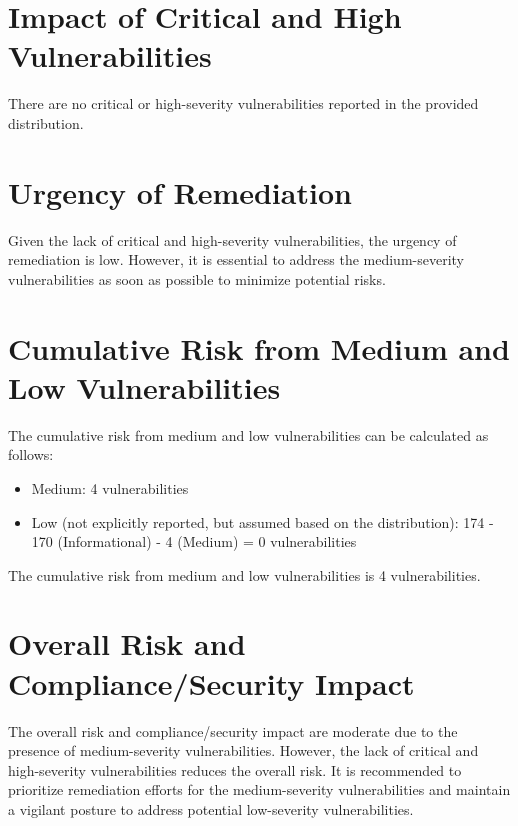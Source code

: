 \section{Impact of Critical and High Vulnerabilities}

There are no critical or high-severity vulnerabilities reported in the provided distribution.

\section{Urgency of Remediation}

Given the lack of critical and high-severity vulnerabilities, the urgency of remediation is low. However, it is essential to address the medium-severity vulnerabilities as soon as possible to minimize potential risks.

\section{Cumulative Risk from Medium and Low Vulnerabilities}

The cumulative risk from medium and low vulnerabilities can be calculated as follows:
\begin{itemize}
\item Medium: 4 vulnerabilities
\item Low (not explicitly reported, but assumed based on the distribution): 174 - 170 (Informational) - 4 (Medium) = 0 vulnerabilities
\end{itemize}
The cumulative risk from medium and low vulnerabilities is 4 vulnerabilities.

\section{Overall Risk and Compliance/Security Impact}

The overall risk and compliance/security impact are moderate due to the presence of medium-severity vulnerabilities. However, the lack of critical and high-severity vulnerabilities reduces the overall risk. It is recommended to prioritize remediation efforts for the medium-severity vulnerabilities and maintain a vigilant posture to address potential low-severity vulnerabilities.


